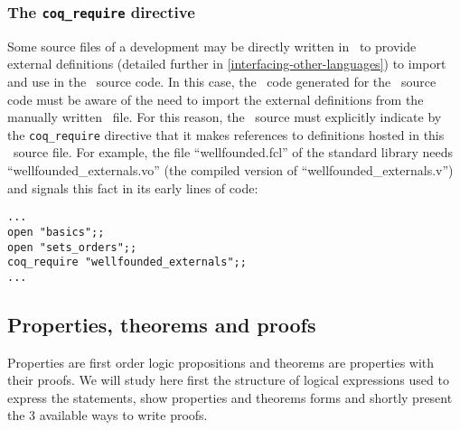 \subsubsection{The {\tt coq\_require} directive}
Some source files of a development may be directly written in \coq\ to
provide external definitions (detailed further in
\ref{interfacing-other-languages}) to import and use in the %
\focal\ source code. In this case, the \coq\ code generated for the
\focal\ source code must be aware of the need to import the external
definitions from the manually written \coq\ file. For this reason, the
\focal\ source must explicitly indicate by the {\tt coq\_require}
directive that it makes references to definitions hosted in this
\coq\ source file. For example, the file ``wellfounded.fcl'' of the
standard library needs ``wellfounded\_externals.vo'' (the compiled version of
``wellfounded\_externals.v'') and signals this
fact in its early lines of code:
{\scriptsize
\begin{lstlisting}
...
open "basics";;
open "sets_orders";;
coq_require "wellfounded_externals";;
...
\end{lstlisting}
}



\subsection{Properties, theorems and proofs}
\label{properties-theorems-proofs}

Properties are first order logic propositions and theorems are
properties with their proofs. We will study here first the structure
of logical expressions used to express the statements, show properties
and theorems forms and shortly present the 3 available ways to write
proofs.



